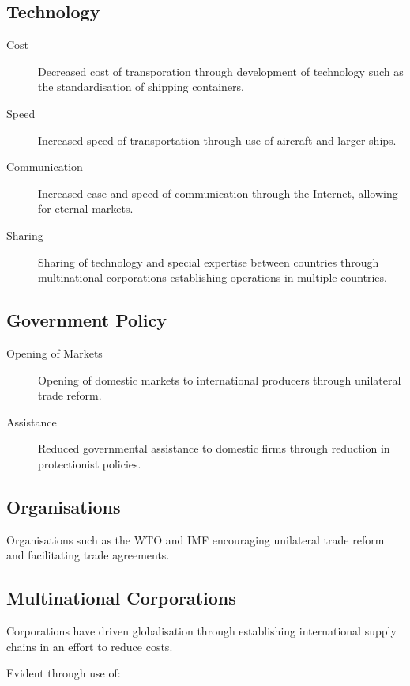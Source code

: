 \documentclass[a4paper,11pt]{article}
\begin{document}
\subsection{Technology}

\begin{description}
\item [Cost] Decreased cost of transporation through development of technology
	such as the standardisation of shipping containers.
\item [Speed] Increased speed of transportation through use of aircraft and
	larger ships.
\item [Communication] Increased ease and speed of communication through the
	Internet, allowing for eternal markets.
\item [Sharing] Sharing of technology and special expertise between countries
	through multinational corporations establishing operations in multiple
	countries.
\end{description}



\subsection{Government Policy}

\begin{description}
\item [Opening of Markets] Opening of domestic markets to international
	producers through unilateral trade reform.
\item [Assistance] Reduced governmental assistance to domestic firms through
	reduction in protectionist policies.
\end{description}


\subsection{Organisations}

Organisations such as the WTO and IMF encouraging unilateral trade reform
and facilitating trade agreements.


\subsection{Multinational Corporations}

Corporations have driven globalisation through establishing international
supply chains in an effort to reduce costs.

Evident through use of:
\end{document}
